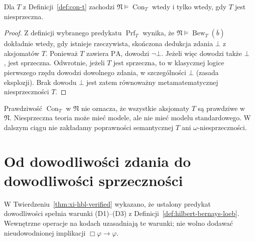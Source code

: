 \begin{lemat}
\label{lem:con-standard}
Dla $T$ z Definicji~\ref{def:con-t} zachodzi
$\mathfrak N\models\operatorname{Con}_T$ wtedy i tylko wtedy,
gdy $T$ jest niesprzeczna.
\end{lemat}
\begin{proof}
Z definicji wybranego predykatu $\operatorname{Prf}_T$
wynika, że $\mathfrak N\models
\operatorname{Bew}_T(\overline b)$ dokładnie wtedy,
gdy istnieje rzeczywista, skończona dedukcja zdania
$\bot$ z aksjomatów $T$. Ponieważ $T$ zawiera
$\mathrm{PA}$, dowodzi $\neg\bot$.
Jeżeli więc dowodzi także $\bot$, jest sprzeczna.
Odwrotnie, jeżeli $T$ jest sprzeczna, to w klasycznej
logice pierwszego rzędu dowodzi dowolnego zdania,
w szczególności $\bot$ (zasada eksplozji).
Brak dowodu $\bot$ jest zatem równoważny
metamatematycznej niesprzeczności $T$.
\end{proof}

\begin{uwaga}
Prawdziwość $\operatorname{Con}_T$ w $\mathfrak N$
nie oznacza, że wszystkie aksjomaty $T$ są prawdziwe
w $\mathfrak N$. Niesprzeczna teoria może mieć modele,
ale nie mieć modelu standardowego. W dalszym ciągu
nie zakładamy poprawności semantycznej $T$ ani
$\omega$-niesprzeczności.
\end{uwaga}

\section{Od dowodliwości zdania do dowodliwości sprzeczności}
W Twierdzeniu~\ref{thm:xi-hbl-verified} wykazano,
że ustalony predykat dowodliwości spełnia warunki
(D1)--(D3) z Definicji~\ref{def:hilbert-bernays-loeb}.
Wewnętrzne operacje na kodach uzasadniają te warunki;
nie wolno dodawać nieudowodnionej implikacji
$\Box\varphi\to\varphi$.

